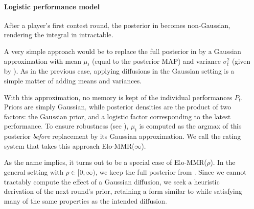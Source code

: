 \paragraph{Logistic performance model}
After a player's first contest round, the posterior in  becomes non-Gaussian, rendering the integral in  intractable.

A very simple approach would be to replace the full posterior in  by a Gaussian approximation with mean $\mu_t$ (equal to the posterior MAP) and variance $\sigma_t^2$ (given by ). As in the previous case, applying diffusions in the Gaussian setting is a simple matter of adding means and variances.

With this approximation, no memory is kept of the individual performances $P_t$. Priors are simply Gaussian, while posterior densities are the product of two factors: the Gaussian prior, and a logistic factor corresponding to the latest performance. To ensure robustness (see ), $\mu_t$ is computed as the argmax of this posterior \emph{before} replacement by its Gaussian approximation. We call the rating system that takes this approach Elo-MMR($\infty$).

As the name implies, it turns out to be a special case of Elo-MMR($\rho$). In the general setting with $\rho \in [0,\infty)$, we keep the full posterior from . Since we cannot tractably compute the effect of a Gaussian diffusion, we seek a heuristic derivation of the next round's prior, retaining a form similar to  while satisfying many of the same properties as the intended diffusion.


